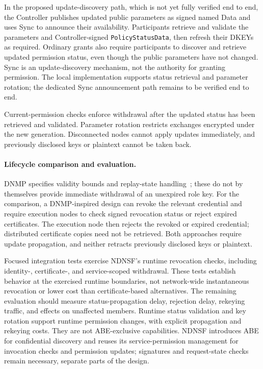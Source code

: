 In the proposed update-discovery path, which is not yet fully verified end to end,
the Controller publishes updated public parameters as signed named Data and uses
Sync to announce their availability.
Participants retrieve and validate the parameters and Controller-signed
\texttt{PolicyStatusData}, then refresh their DKEYs as required. Ordinary grants
also require participants to discover and retrieve updated permission status,
even though the public parameters have not changed. Sync is an update-discovery
mechanism, not the authority for granting permission. The local implementation
supports status retrieval and parameter rotation; the dedicated Sync announcement
path remains to be verified end to end.

Current-permission checks enforce withdrawal after the updated status has been
retrieved and validated. Parameter rotation restricts exchanges encrypted under
the new generation. Disconnected nodes cannot apply updates immediately, and
previously disclosed keys or plaintext cannot be taken back.

\paragraph{Lifecycle comparison and evaluation.}

DNMP specifies validity bounds and replay-state handling~\cite{dnmp}; these
do not by themselves provide immediate withdrawal of an unexpired role key.
For the comparison, a DNMP-inspired design can revoke
the relevant credential and require execution nodes to check signed revocation
status or reject expired certificates. The execution node then rejects the
revoked or expired credential; distributed certificate copies need not be retrieved.
Both approaches require update propagation, and neither retracts previously
disclosed keys or plaintext.

Focused integration tests exercise NDNSF's runtime revocation checks, including
identity-, certificate-, and service-scoped withdrawal. These tests establish
behavior at the exercised runtime boundaries, not network-wide instantaneous
revocation or lower cost than certificate-based alternatives. The remaining
evaluation should measure status-propagation delay, rejection delay, rekeying
traffic, and effects on unaffected members. Runtime status validation and key
rotation support runtime permission changes, with explicit propagation and
rekeying costs. They are not ABE-exclusive capabilities. NDNSF introduces ABE
for confidential discovery and reuses its service-permission management for
invocation checks and permission updates; signatures and request-state checks
remain necessary, separate parts of the design.
